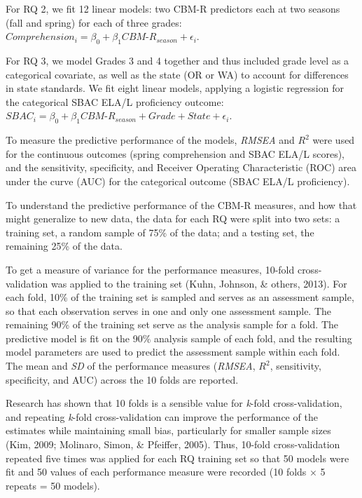\documentclass[
  english,
  man, fleqn, noextraspace]{apa6}
\begin{document}
For RQ 2, we fit 12 linear models: two CBM-R predictors each at two seasons (fall and spring) for each of three grades: \(Comprehension_i = \beta_0 + \beta_1CBM\mbox{-}R_{season} + \epsilon_i\).

For RQ 3, we model Grades 3 and 4 together and thus included grade level as a categorical covariate, as well as the state (OR or WA) to account for differences in state standards. We fit eight linear models, applying a logistic regression for the categorical SBAC ELA/L proficiency outcome: \(SBAC_i = \beta_0 + \beta_1CBM\mbox{-}R_{season} + Grade + State + \epsilon_i\).

To measure the predictive performance of the models, \emph{RMSEA} and \(R^2\) were used for the continuous outcomes (spring comprehension and SBAC ELA/L scores), and the sensitivity, specificity, and Receiver Operating Characteristic (ROC) area under the curve (AUC) for the categorical outcome (SBAC ELA/L proficiency).

To understand the predictive performance of the CBM-R measures, and how that might generalize to new data, the data for each RQ were split into two sets: a training set, a random sample of 75\% of the data; and a testing set, the remaining 25\% of the data.

To get a measure of variance for the performance measures, 10-fold cross-validation was applied to the training set (Kuhn, Johnson, \& others, 2013). For each fold, 10\% of the training set is sampled and serves as an assessment sample, so that each observation serves in one and only one assessment sample. The remaining 90\% of the training set serve as the analysis sample for a fold. The predictive model is fit on the 90\% analysis sample of each fold, and the resulting model parameters are used to predict the assessment sample within each fold. The mean and \emph{SD} of the performance measures (\emph{RMSEA}, \(R^2\), sensitivity, specificity, and AUC) across the 10 folds are reported.

Research has shown that 10 folds is a sensible value for \emph{k}-fold cross-validation, and repeating \emph{k}-fold cross-validation can improve the performance of the estimates while maintaining small bias, particularly for smaller sample sizes (Kim, 2009; Molinaro, Simon, \& Pfeiffer, 2005). Thus, 10-fold cross-validation repeated five times was applied for each RQ training set so that 50 models were fit and 50 values of each performance measure were recorded (10 folds \(\times\) 5 repeats = 50 models).
\end{document}

